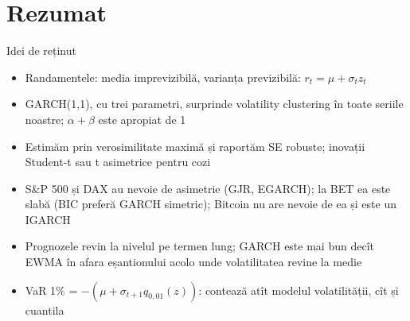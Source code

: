 \section{Rezumat}

\begin{frame}{Idei de reținut}
\itemsize{\small}
\begin{itemize}
    \item Randamentele: media imprevizibilă, varianța previzibilă: $r_t = \mu + \sigma_t z_t$
    \item GARCH(1,1), cu trei parametri, surprinde volatility clustering în toate seriile noastre; $\alpha + \beta$ este apropiat de 1
    \item Estimăm prin verosimilitate maximă și raportăm SE robuste; inovații Student-t sau t asimetrice pentru cozi
    \item S\&P 500 și DAX au nevoie de asimetrie (GJR, EGARCH); la BET ea este slabă (BIC preferă GARCH simetric); Bitcoin nu are nevoie de ea și este un IGARCH
    \item Prognozele revin la nivelul pe termen lung; GARCH este mai bun decît EWMA în afara eșantionului acolo unde volatilitatea revine la medie
    \item VaR 1\% = $-(\mu + \sigma_{t+1}q_{0{,}01}(z))$: contează atît modelul volatilității, cît și cuantila
\end{itemize}
\end{frame}

